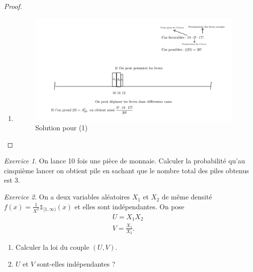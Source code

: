 \documentclass[french]{book}
\theoremstyle{definition}
\theoremstyle{remark}
\newtheorem{exo}{Exercice}
\begin{document}
\begin{proof}

  \

  \begin{enumerate}
    \item

    \begin{figure}[h!]
      \centering
      \includegraphics[scale=0.3]{figures/exo_livres.png}
      \caption{Solution pour (1)}
      \label{}
    \end{figure}

  \end{enumerate}
\end{proof}

\begin{exo}
  On lance 10 fois une pièce de monnaie. Calculer la probabilité qu'au cinquième lancer on obtient pile en sachant que le nombre total des piles obtenus est 3.
\end{exo}

\begin{exo}
  On a deux variables aléatoires \(X_1\) et \(X_2\) de même densité \(f(x) = \frac{1}{X ^2} \mathds{1}_{[1, \infty)}(x)\) et elles sont indépendantes. On pose
  \begin{gather*}
    U = X_1 X_2 \\
    V = \frac{X_1}{X_2}.
  \end{gather*}

  \begin{enumerate}
    \item Calculer la loi du couple \((U,V)\).
    \item \(U \text{ et } V \) sont-elles indépendantes ?
  \end{enumerate}
\end{exo}
\end{document}
